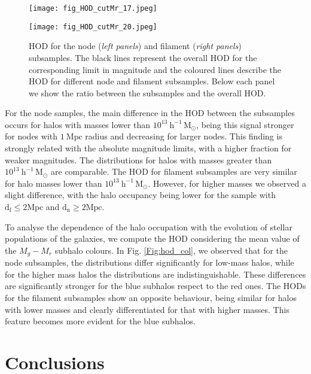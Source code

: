 \documentclass[baaa]{baaa}
\begin{document}
\begin{figure*}[!h]
\centering
    \texttt{[image: fig\_HOD\_cutMr\_17.jpeg]}



    \texttt{[image: fig\_HOD\_cutMr\_20.jpeg]}
\caption{HOD for the node (\emph{left panels}) and filament (\emph{right panels}) subsamples. The black lines represent the overall HOD for the corresponding limit in magnitude and the coloured lines describe the HOD for different node and filament subsamples. Below each panel we show the ratio between the subsamples and the overall HOD.}
\label{Fig:hod_mag}
\end{figure*}

For the node samples, the main difference in the HOD between the subsamples occurs for halos with masses lower than $10^{13}~\mathrm{h^{-1}\,M}_{\odot}$, being this signal stronger for nodes with $1~\mathrm{Mpc}$ radius and decreasing for larger nodes. This finding is strongly related with the absolute magnitude limits, with a higher fraction for weaker magnitudes. The distributions for halos with masses greater than $10^{13}~\mathrm{h^{-1}\,M}_{\odot}$ are comparable.
The HOD for filament subsamples are very similar for halo masses lower than $10^{13}~\mathrm{h^{-1}\,M}_{\odot}$. 
However, for higher masses we observed a slight difference, with the halo occupancy being lower for the sample with $\mathrm{d_f} \leq 2 \mathrm{Mpc}$ and $\mathrm{d_n} \geq 2 \mathrm{Mpc}$.

To analyse the dependence of the halo occupation with the evolution of stellar populations of the galaxies, we compute the HOD considering the mean value of the $M_g-M_r$ subhalo colours.
In Fig. \ref{Fig:hod_col}, we observed that for the node subsamples, the distributions differ significantly for low-mass halos, while for the higher mass halos the distributions are indistinguishable. These differences are significantly stronger for the blue subhalos respect to the red ones.
The HODs for the filament subsamples show an opposite behaviour, being similar for halos with lower masses and clearly differentiated for that with higher masses. This feature becomes more evident for the blue subhalos.

\section{Conclusions}
\end{document}
